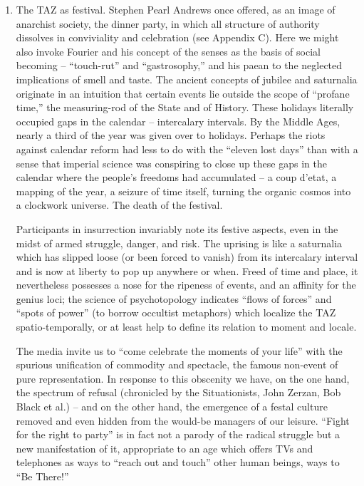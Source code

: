 \documentclass[a4paper,english,10pt,twoside]{article}
\begin{document}
\begin{enumerate}
\medskip
    \item{The TAZ as festival. Stephen Pearl Andrews once offered, as an image of anarchist society, the dinner party, in which all structure of authority dissolves in conviviality and celebration (see Appendix C). Here we might also invoke Fourier and his concept of the senses as the basis of social becoming -- \enquote{touch-rut} and \enquote{gastrosophy,} and his paean to the neglected implications of smell and taste. The ancient concepts of jubilee and saturnalia originate in an intuition that certain events lie outside the scope of \enquote{profane time,} the measuring-rod of the State and of History. These holidays literally occupied gaps in the calendar -- intercalary intervals. By the Middle Ages, nearly a third of the year was given over to holidays. Perhaps the riots against calendar reform had less to do with the \enquote{eleven lost days} than with a sense that imperial science was conspiring to close up these gaps in the calendar where the people's freedoms had accumulated -- a coup d'etat, a mapping of the year, a seizure of time itself, turning the organic cosmos into a clockwork universe. The death of the festival.

\medskip
Participants in insurrection invariably note its festive aspects, even in the midst of armed struggle, danger, and risk. The uprising is like a saturnalia which has slipped loose (or been forced to vanish) from its intercalary interval and is now at liberty to pop up anywhere or when. Freed of time and place, it nevertheless possesses a nose for the ripeness of events, and an affinity for the genius loci; the science of psychotopology indicates \enquote{flows of forces} and \enquote{spots of power} (to borrow occultist metaphors) which localize the TAZ spatio-temporally, or at least help to define its relation to moment and locale.

\medskip
The media invite us to \enquote{come celebrate the moments of your life} with the spurious unification of commodity and spectacle, the famous non-event of pure representation. In response to this obscenity we have, on the one hand, the spectrum of refusal (chronicled by the Situationists, John Zerzan, Bob Black et al.) -- and on the other hand, the emergence of a festal culture removed and even hidden from the would-be managers of our leisure. \enquote{Fight for the right to party} is in fact not a parody of the radical struggle but a new manifestation of it, appropriate to an age which offers TVs and telephones as ways to \enquote{reach out and touch} other human beings, ways to \enquote{Be There!}

}
\end{enumerate}
\end{document}

